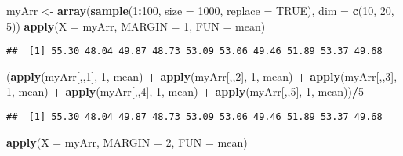 \documentclass[]{book}
\newenvironment{Shaded}{\begin{snugshade}}{\end{snugshade}}
\newcommand{\KeywordTok}[1]{\textcolor[rgb]{0.13,0.29,0.53}{\textbf{#1}}}
\newcommand{\DataTypeTok}[1]{\textcolor[rgb]{0.13,0.29,0.53}{#1}}
\newcommand{\DecValTok}[1]{\textcolor[rgb]{0.00,0.00,0.81}{#1}}
\newcommand{\StringTok}[1]{\textcolor[rgb]{0.31,0.60,0.02}{#1}}
\newcommand{\OtherTok}[1]{\textcolor[rgb]{0.56,0.35,0.01}{#1}}
\newcommand{\OperatorTok}[1]{\textcolor[rgb]{0.81,0.36,0.00}{\textbf{#1}}}
\newcommand{\NormalTok}[1]{#1}
\theoremstyle{definition}
\theoremstyle{definition}
\theoremstyle{definition}
\theoremstyle{remark}
\begin{document}
\begin{Shaded}
\begin{Highlighting}[]
\NormalTok{myArr <-}\StringTok{ }\KeywordTok{array}\NormalTok{(}\KeywordTok{sample}\NormalTok{(}\DecValTok{1}\OperatorTok{:}\DecValTok{100}\NormalTok{, }\DataTypeTok{size =} \DecValTok{1000}\NormalTok{, }\DataTypeTok{replace =} \OtherTok{TRUE}\NormalTok{), }\DataTypeTok{dim =} \KeywordTok{c}\NormalTok{(}\DecValTok{10}\NormalTok{, }\DecValTok{20}\NormalTok{, }\DecValTok{5}\NormalTok{))}
\KeywordTok{apply}\NormalTok{(}\DataTypeTok{X =}\NormalTok{ myArr, }\DataTypeTok{MARGIN =} \DecValTok{1}\NormalTok{, }\DataTypeTok{FUN =}\NormalTok{ mean)}
\end{Highlighting}
\end{Shaded}

\begin{verbatim}
##  [1] 55.30 48.04 49.87 48.73 53.09 53.06 49.46 51.89 53.37 49.68
\end{verbatim}

\begin{Shaded}
\begin{Highlighting}[]
\NormalTok{(}\KeywordTok{apply}\NormalTok{(myArr[,,}\DecValTok{1}\NormalTok{], }\DecValTok{1}\NormalTok{, mean) }\OperatorTok{+}\StringTok{ }\KeywordTok{apply}\NormalTok{(myArr[,,}\DecValTok{2}\NormalTok{], }\DecValTok{1}\NormalTok{, mean) }\OperatorTok{+}\StringTok{ }
\StringTok{  }\KeywordTok{apply}\NormalTok{(myArr[,,}\DecValTok{3}\NormalTok{], }\DecValTok{1}\NormalTok{, mean) }\OperatorTok{+}\StringTok{ }\KeywordTok{apply}\NormalTok{(myArr[,,}\DecValTok{4}\NormalTok{], }\DecValTok{1}\NormalTok{, mean) }\OperatorTok{+}\StringTok{ }
\StringTok{  }\KeywordTok{apply}\NormalTok{(myArr[,,}\DecValTok{5}\NormalTok{], }\DecValTok{1}\NormalTok{, mean))}\OperatorTok{/}\DecValTok{5}
\end{Highlighting}
\end{Shaded}

\begin{verbatim}
##  [1] 55.30 48.04 49.87 48.73 53.09 53.06 49.46 51.89 53.37 49.68
\end{verbatim}

\begin{Shaded}
\begin{Highlighting}[]
\KeywordTok{apply}\NormalTok{(}\DataTypeTok{X =}\NormalTok{ myArr, }\DataTypeTok{MARGIN =} \DecValTok{2}\NormalTok{, }\DataTypeTok{FUN =}\NormalTok{ mean)}
\end{Highlighting}
\end{Shaded}
\end{document}
